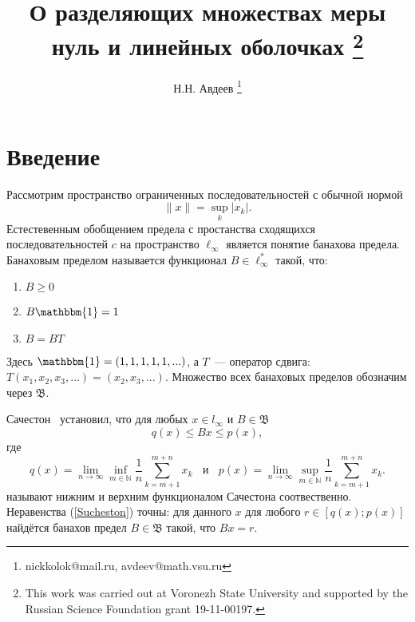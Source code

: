 \documentclass[a4paper,14pt]{article} %
\theoremstyle{plain}
\theoremstyle{definition}
\begin{document}

\title{
	О разделяющих множествах меры нуль и линейных оболочках
	\footnote{
		This work was carried out at Voronezh State University and supported by the Russian Science
		Foundation grant 19-11-00197.
	}
}

\author{
	Н.Н. Авдеев
	\footnote{nickkolok@mail.ru, avdeev@math.vsu.ru}
}

\maketitle

\section{Введение}

Рассмотрим пространство ограниченных последовательностей с обычной нормой
\begin{equation*}
	\|x\| = \sup_{k} |x_k|
	.
\end{equation*}
Естестевенным обобщением предела с простанства сходящихся последовательностей $c$ на пространство $\ell_\infty$
является понятие банахова предела.
Банаховым пределом называется функционал $B\in \ell_\infty^*$ такой, что:
\begin{enumerate}
	\item
		$B \geqslant 0$
	\item
		$B\mathbbm{1} = 1$
	\item
		$B=BT$
\end{enumerate}
Здесь $\mathbbm{1}=(1,1,1,1,1,...)$,
а $T$~--- оператор сдвига: $T(x_1, x_2, x_3, ...) = (x_2, x_3, ...)$.
Множество всех банаховых пределов обозначим через $\mathfrak{B}$.

Сачестон~\cite{sucheston1967banach} установил, что
для любых $x\in l_\infty$ и $B\in\mathfrak{B}$
\begin{equation}\label{Sucheston}
	q(x) \leqslant Bx \leqslant p(x)
	,
\end{equation}
где
\begin{equation*}
	q(x) = \lim_{n\to\infty} \inf_{m\in\mathbb{N}}  \frac{1}{n} \sum_{k=m+1}^{m+n} x_k
	~~~~\mbox{и}~~~~
	p(x) = \lim_{n\to\infty} \sup_{m\in\mathbb{N}}  \frac{1}{n} \sum_{k=m+1}^{m+n} x_k
	.
\end{equation*}
называют нижним и верхним функционалом Сачестона соотвественно.
Неравенства (\ref{Sucheston}) точны:
для данного $x$ для любого $r\in[q(x); p(x)]$ найдётся банахов предел
$B\in\mathfrak{B}$ такой, что $Bx = r$.
\end{document}
